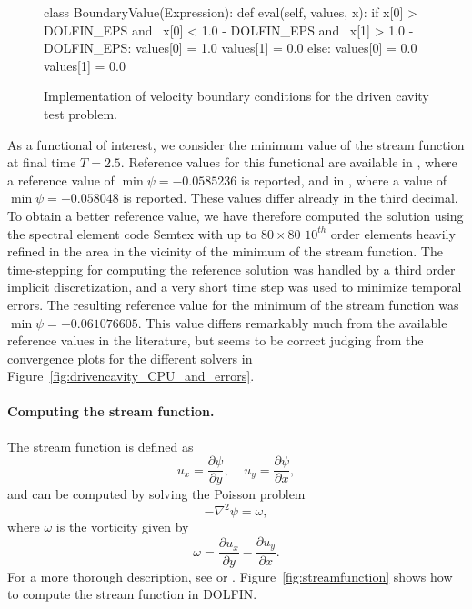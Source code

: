 \begin{figure}
  \begin{center}
    \begin{python}
class BoundaryValue(Expression):
    def eval(self, values, x):
        if x[0] > DOLFIN_EPS and \
           x[0] < 1.0 - DOLFIN_EPS and \
           x[1] > 1.0 - DOLFIN_EPS:
            values[0] = 1.0
            values[1] = 0.0
        else:
            values[0] = 0.0
            values[1] = 0.0
    \end{python}
    \caption{Implementation of velocity boundary conditions for the
      driven cavity test problem.}
    \label{fig:bc_drivencavity}
  \end{center}
\end{figure}

As a functional of interest, we consider the minimum value of the
stream function at final time $T = 2.5$. Reference values for this
functional are available in \citet{PanditKalitaDalal2007}, where a
reference value of $\min\psi = -0.0585236$ is reported, and
in \citet{ChudanovPopkovChurbanovEtAl2007}, where a value of $\min\psi
= -0.058048$ is reported. These values differ already in the third
decimal. To obtain a better reference value, we have therefore
computed the solution using the spectral element code Semtex \citep{Blackburn2009,Blackburn2004}
with up to $80 \times 80$ $10^{th}$ order elements heavily refined in
the area in the vicinity of the minimum of the stream function. The
time-stepping for computing the reference solution was handled by a
third order implicit discretization, and a very short time step was used
to minimize temporal errors. The resulting reference value for the
minimum of the stream function was $\min\psi =-0.061076605$. This
value differs remarkably much from the available reference values in
the literature, but seems to be correct judging from the convergence
plots for the different solvers in
Figure~\ref{fig:drivencavity_CPU_and_errors}.

\paragraph{Computing the stream function.}

The stream function is defined as
\begin{equation}
  u_x = \frac{\partial{\psi}}{\partial{y}}, \;\; \;\;  u_y = \frac{\partial{\psi}}{\partial{x}},
\end{equation}
and can be computed by solving the Poisson problem
\begin{equation}
  -\nabla^2 \psi = \omega,
 \end{equation}
where $\omega$ is the vorticity given by
\begin{equation}
  \omega = \frac{\partial{u_x}}{\partial{y}} - \frac{\partial{u_y}}{\partial{x}}.
\end{equation}
For a more thorough description, see \citet{White1999}
or \citet{White1991}. Figure~\ref{fig:streamfunction} shows how to
compute the stream function in DOLFIN.

